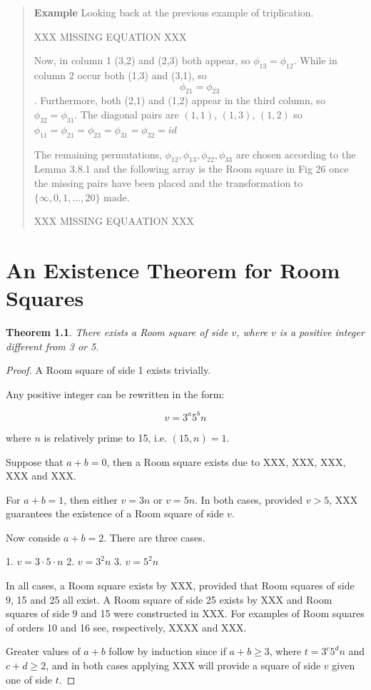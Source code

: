 \documentclass[
  11pt,
  a4paper]{book}
\newtheorem{theorem}{Theorem}
\newcounter{examplecounter}
\begin{document}
\begin{quote}  \textbf{Example } \quad 
Looking back at the previous example of triplication.

XXX MISSING EQUATION XXX

Now, in column 1 (3,2) and (2,3) both appear, so
$\phi _{13} = \phi _{12}$.
While in column 2 occur both (1,3) and
(3,1), so $$\phi _{21} = \phi _{23}$$.
Furthermore, both (2,1) and (1,2) appear in the third
column, so $\phi _{32} = \phi _{31}$.
The diagonal pairs are $(1, 1)$, $(1, 3)$, $(1, 2)$ so
$\phi _{11} = \phi _{21} = \phi _{23} = \phi _{31} = \phi _{32} = id$

The remaining permutations,
$\phi _{12}, \phi _{13}, \phi _{22}, \phi _{33}$ are chosen
according to the Lemma 3.8.1
and the following array is the Room square in Fig 26 once
the missing pairs have been placed and the transformation to
$\{\infty, 0, 1, ..., 20\}$ made.

XXX MISSING EQUAATION XXX
 \end{quote}

\hypertarget{an-existence-theorem-for-room-squares}{%
\chapter{An Existence Theorem for Room Squares}\label{an-existence-theorem-for-room-squares}}

\begin{theorem}
There exists a Room square of side $v$, where $v$
is a positive integer different from 3 or 5.
\end{theorem}

\begin{proof}
A Room square of side 1 exists trivially.

Any positive integer can be rewritten in the form:

\begin{equation}
v = 3^{a}5^{b}n
\end{equation}

where $n$ is relatively prime to 15, i.e.
$(15, n) = 1$.

Suppose that $a + b = 0$, then a Room square exists
due to XXX, XXX, XXX, XXX and XXX.

For $a + b = 1$, then either $v = 3n$ or $v = 5n$.
In both cases, provided $v > 5$, XXX guarantees the
existence of a Room square of side $v$.

Now conside $a + b = 2$. There are three cases.

1. $v = 3\cdot 5\cdot n$
2. $v = 3^{2}n$
3. $v = 5^{2}n$

In all cases, a Room square exists by XXX, provided
that Room squares of side 9, 15 and 25 all exist. A
Room square of side 25 exists by XXX and Room squares
of side 9 and 15 were constructed in XXX. For examples
of Room squares of orders 10 and 16 see, respectively,
XXXX and XXX.

Greater values of $a + b$ follow by induction since if
$a + b \geq 3$, where $t = 3^{c}5^{d}n$ and
$c + d \geq 2$, and in both cases applying XXX will
provide a square of side $v$ given one of side $t$.
\end{proof}
\end{document}
